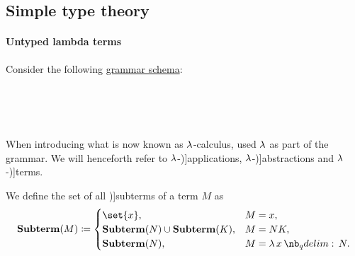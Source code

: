 \subsection{Simple type theory}\label{subsec:simple_type_theory}

\paragraph{Untyped lambda terms}

\begin{definition}\label{def:lambda_term}\mimprovised
  Consider the following \hyperref[def:formal_grammar/schema]{grammar schema}:
  \begin{bnf*}
        {} \\
     {\bnftsq{\( ( \)} \bnfsp {} \bnfsp {} \bnfsp \bnftsq{\( ) \)}} \\
     {\bnftsq{\( ( \)} \bnfsp \bnftsq{\( \synlambda \)} \bnfsp {} \bnfsp {} \bnfsp {} \bnfsp \bnftsq{\( ) \)}} \\
            { \bnfor {} \bnfor {}}
  \end{bnf*}

  When introducing what is now known as \( \synlambda \)-calculus,  used \( \synlambda \) as part of the grammar. We will henceforth refer to \( \synlambda \)-\term[ru=апликация (\cite[188]{Герасимов2011})]{applications}, \( \synlambda \)-\term[ru=абстракция (\cite[188]{Герасимов2011})]{abstractions} and \( \synlambda \)-\term[ru=терм (\cite[188]{Герасимов2011})]{terms}.

  \begin{thmenum}
     We define the set of all \term[ru=подтерм (\cite[189]{Герасимов2011})]{subterms} of a term \( M \) as
    \begin{equation*}
      \boldop{Subterm}(M) \coloneqq \begin{cases}
        \set{ x },                                    &M = x, \\
        \boldop{Subterm}(N) \cup \boldop{Subterm}(K), &M = N K, \\
        \boldop{Subterm}(N),                          &M = \qabs x N.
      \end{cases}
    \end{equation*}


\end{thmenum}
\end{definition}
